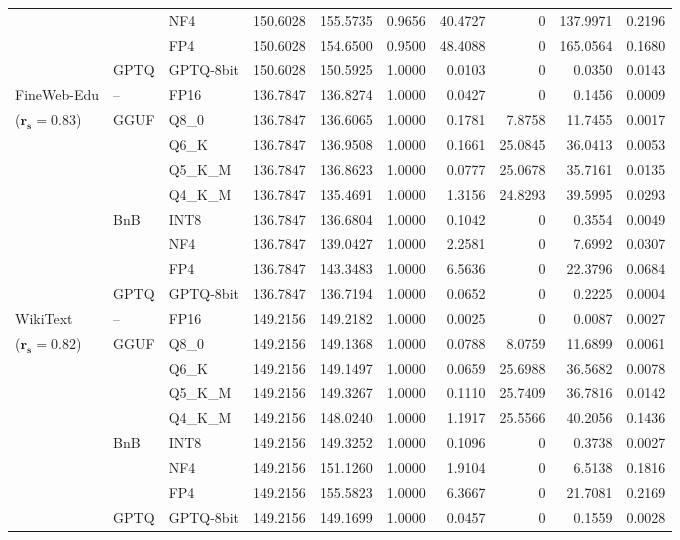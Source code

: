 \begin{table}[t]
{\begin{tabular}{ll l rrrrrrr}
 &  & NF4 & 150.6028 & 155.5735 & 0.9656 & 40.4727 & \cellcolor{cyan!12} $0$ & 137.9971 & 0.2196 \\
 &  & FP4 & 150.6028 & 154.6500 & 0.9500 & 48.4088 & \cellcolor{cyan!12} $0$ & 165.0564 & 0.1680 \\
 & GPTQ & GPTQ-8bit & 150.6028 & 150.5925 & 1.0000 & 0.0103 & \cellcolor{cyan!12} $0$ & 0.0350 & 0.0143 \\
\midrule
FineWeb-Edu & -- & FP16 & 136.7847 & 136.8274 & 1.0000 & 0.0427 & \cellcolor{cyan!12} $0$ & 0.1456 & 0.0009 \\
{\small ($\mathbf{r_s{=}0.83}$)} & GGUF & Q8\_0 & 136.7847 & 136.6065 & 1.0000 & 0.1781 & 7.8758 & 11.7455 & 0.0017 \\
 &  & Q6\_K & 136.7847 & 136.9508 & 1.0000 & 0.1661 & 25.0845 & 36.0413 & 0.0053 \\
 &  & Q5\_K\_M & 136.7847 & 136.8623 & 1.0000 & 0.0777 & 25.0678 & 35.7161 & 0.0135 \\
 &  & Q4\_K\_M & 136.7847 & 135.4691 & 1.0000 & 1.3156 & 24.8293 & 39.5995 & 0.0293 \\
 & BnB & INT8 & 136.7847 & 136.6804 & 1.0000 & 0.1042 & \cellcolor{cyan!12} $0$ & 0.3554 & 0.0049 \\
 &  & NF4 & 136.7847 & 139.0427 & 1.0000 & 2.2581 & \cellcolor{cyan!12} $0$ & 7.6992 & 0.0307 \\
 &  & FP4 & 136.7847 & 143.3483 & 1.0000 & 6.5636 & \cellcolor{cyan!12} $0$ & 22.3796 & 0.0684 \\
 & GPTQ & GPTQ-8bit & 136.7847 & 136.7194 & 1.0000 & 0.0652 & \cellcolor{cyan!12} $0$ & 0.2225 & 0.0004 \\
\midrule
WikiText & -- & FP16 & 149.2156 & 149.2182 & 1.0000 & 0.0025 & \cellcolor{cyan!12} $0$ & 0.0087 & 0.0027 \\
{\small ($\mathbf{r_s{=}0.82}$)} & GGUF & Q8\_0 & 149.2156 & 149.1368 & 1.0000 & 0.0788 & 8.0759 & 11.6899 & 0.0061 \\
 &  & Q6\_K & 149.2156 & 149.1497 & 1.0000 & 0.0659 & 25.6988 & 36.5682 & 0.0078 \\
 &  & Q5\_K\_M & 149.2156 & 149.3267 & 1.0000 & 0.1110 & 25.7409 & 36.7816 & 0.0142 \\
 &  & Q4\_K\_M & 149.2156 & 148.0240 & 1.0000 & 1.1917 & 25.5566 & 40.2056 & 0.1436 \\
 & BnB & INT8 & 149.2156 & 149.3252 & 1.0000 & 0.1096 & \cellcolor{cyan!12} $0$ & 0.3738 & 0.0027 \\
 &  & NF4 & 149.2156 & 151.1260 & 1.0000 & 1.9104 & \cellcolor{cyan!12} $0$ & 6.5138 & 0.1816 \\
 &  & FP4 & 149.2156 & 155.5823 & 1.0000 & 6.3667 & \cellcolor{cyan!12} $0$ & 21.7081 & 0.2169 \\
 & GPTQ & GPTQ-8bit & 149.2156 & 149.1699 & 1.0000 & 0.0457 & \cellcolor{cyan!12} $0$ & 0.1559 & 0.0028 \\
\bottomrule
\end{tabular}}
\end{table}